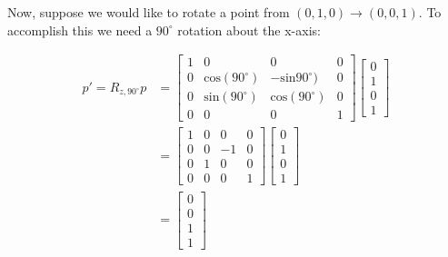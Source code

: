 \documentclass[12pt,letterpaper]{article}
\begin{document}
\newpage

Now, suppose we would like to rotate a point from $(0, 1, 0) \rightarrow (0, 0, 1)$. To accomplish this we need a $90^{\circ}$ rotation about the x-axis:

\begin{equation}
    \begin{aligned}
    p' = R_{z, 90^{\circ}}p
    &= \begin{bmatrix}
        1 & 0 & 0 & 0 \\
        0 & \text{cos}(90^{\circ}) & -\text{sin}90^{\circ}) & 0 \\
        0 & \text{sin}(90^{\circ}) &  \text{cos}(90^{\circ}) & 0 \\
        0 & 0 & 0 & 1
    \end{bmatrix}
     \begin{bmatrix}
        0 \\
        1 \\
        0 \\
        1
    \end{bmatrix} \\
    &= \begin{bmatrix}
        1 & 0 &  0 & 0 \\
        0 & 0 & -1 & 0 \\
        0 & 1 &  0 & 0 \\
        0 & 0 &  0 & 1
    \end{bmatrix}
     \begin{bmatrix}
        0 \\
        1 \\
        0 \\
        1
    \end{bmatrix} \\
    &= \begin{bmatrix}
        0 \\
        0 \\
        1 \\
        1
    \end{bmatrix}
    \end{aligned}
\end{equation}
\end{document}
